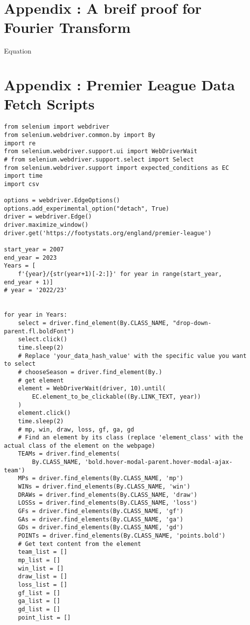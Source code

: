 % 
% 
\appendix
% 
\section{Appendix \uppercase\expandafter{}: A breif proof for Fourier Transform}\label{sec:Fourier}
% 
Equation
% 
% 
% 
% 
% 
% 
% 
% 
% 
% 
% 
% 
% 
% 
% 
% 
% 
% 
% 
% 
% 
% 
\section{Appendix \uppercase\expandafter{}: Premier League Data Fetch Scripts}\label{sec:GetData}
\begin{lstlisting}[style=pystyle]
from selenium import webdriver
from selenium.webdriver.common.by import By
import re
from selenium.webdriver.support.ui import WebDriverWait
# from selenium.webdriver.support.select import Select
from selenium.webdriver.support import expected_conditions as EC
import time
import csv

options = webdriver.EdgeOptions()
options.add_experimental_option("detach", True)
driver = webdriver.Edge()
driver.maximize_window()
driver.get('https://footystats.org/england/premier-league')

start_year = 2007
end_year = 2023
Years = [
    f'{year}/{str(year+1)[-2:]}' for year in range(start_year, end_year + 1)]
# year = '2022/23'


for year in Years:
    select = driver.find_element(By.CLASS_NAME, "drop-down-parent.fl.boldFont")
    select.click()
    time.sleep(2)
    # Replace 'your_data_hash_value' with the specific value you want to select
    # chooseSeason = driver.find_element(By.)
    # get element
    element = WebDriverWait(driver, 10).until(
        EC.element_to_be_clickable((By.LINK_TEXT, year))
    )
    element.click()
    time.sleep(2)
    # mp, win, draw, loss, gf, ga, gd
    # Find an element by its class (replace 'element_class' with the actual class of the element on the webpage)
    TEAMs = driver.find_elements(
        By.CLASS_NAME, 'bold.hover-modal-parent.hover-modal-ajax-team')
    MPs = driver.find_elements(By.CLASS_NAME, 'mp')
    WINs = driver.find_elements(By.CLASS_NAME, 'win')
    DRAWs = driver.find_elements(By.CLASS_NAME, 'draw')
    LOSSs = driver.find_elements(By.CLASS_NAME, 'loss')
    GFs = driver.find_elements(By.CLASS_NAME, 'gf')
    GAs = driver.find_elements(By.CLASS_NAME, 'ga')
    GDs = driver.find_elements(By.CLASS_NAME, 'gd')
    POINTs = driver.find_elements(By.CLASS_NAME, 'points.bold')
    # Get text content from the element
    team_list = []
    mp_list = []
    win_list = []
    draw_list = []
    loss_list = []
    gf_list = []
    ga_list = []
    gd_list = []
    point_list = []


\end{lstlisting}
